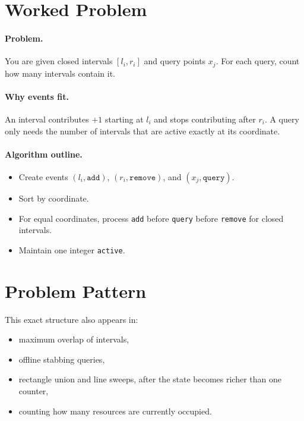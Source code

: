 \section*{Worked Problem}

\paragraph{Problem.}
You are given closed intervals \([l_i, r_i]\) and query points \(x_j\). For each query, count how many intervals
contain it.

\paragraph{Why events fit.}
An interval contributes \(+1\) starting at \(l_i\) and stops contributing after \(r_i\). A query only needs the number
of intervals that are active exactly at its coordinate.

\paragraph{Algorithm outline.}

\begin{itemize}
  \item Create events \((l_i, \texttt{add})\), \((r_i, \texttt{remove})\), and \((x_j, \texttt{query})\).
  \item Sort by coordinate.
  \item For equal coordinates, process \texttt{add} before \texttt{query} before \texttt{remove} for closed intervals.
  \item Maintain one integer \texttt{active}.
\end{itemize}

\section*{Problem Pattern}

This exact structure also appears in:

\begin{itemize}
  \item maximum overlap of intervals,
  \item offline stabbing queries,
  \item rectangle union and line sweeps, after the state becomes richer than one counter,
  \item counting how many resources are currently occupied.
\end{itemize}

